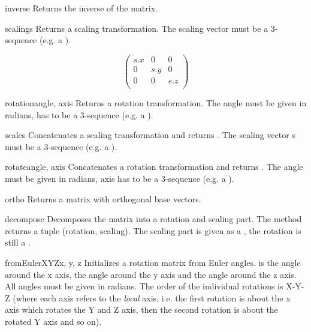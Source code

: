 \begin{methoddesc}{inverse}{}
Returns the inverse of the matrix.
\end{methoddesc}

\begin{methoddesc}{scaling}{s}
Returns a scaling transformation. The scaling vector  must be a
3-sequence (e.g. a ).

\[ \left( \begin{array}{ccc}
s.x & 0 & 0 \\
0 & s.y & 0 \\
0 & 0 & s.z \\
\end{array} \right) \]
\end{methoddesc}

\begin{methoddesc}{rotation}{angle, axis}
Returns a rotation transformation. The angle must be given in radians,
 has to be a 3-sequence (e.g. a ).
\end{methoddesc}

\begin{methoddesc}{scale}{s}
Concatenates a scaling transformation and returns . The scaling
vector s must be a 3-sequence (e.g. a ).
\end{methoddesc}

\begin{methoddesc}{rotate}{angle, axis}
Concatenates a rotation transformation and returns . The angle
must be given in radians, axis has to be a 3-sequence (e.g. a ).
\end{methoddesc}

\begin{methoddesc}{ortho}{}
Returns a matrix with orthogonal base vectors.
\end{methoddesc}

\begin{methoddesc}{decompose}{}
Decomposes the matrix into a rotation and scaling part. The method
returns a tuple (rotation, scaling). The scaling part is given as a
, the rotation is still a .
\end{methoddesc}

\begin{methoddesc}{fromEulerXYZ}{x, y, z}
Initializes a rotation matrix from Euler angles.  is the angle
around the x axis,  the angle around the y axis and  the
angle around the z axis. All angles must be given in radians. The order
of the individual rotations is X-Y-Z (where each axis refers to the {\em
local} axis, i.e. the first rotation is about the x axis which rotates
the Y and Z axis, then the second rotation is about the rotated Y axis 
and so on).
\end{methoddesc}

